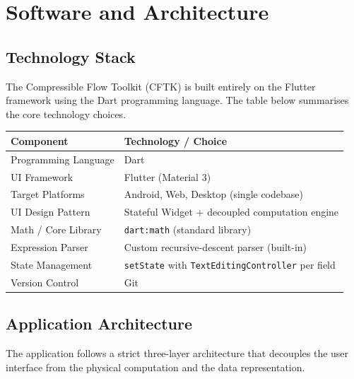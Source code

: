 \chapter{Software and Architecture}

\section{Technology Stack}

The Compressible Flow Toolkit (CFTK) is built entirely on the Flutter framework using the Dart programming language. The table below summarises the core technology choices.

\begin{center}
\begin{tabular}{@{}ll@{}}
\toprule
\textbf{Component} & \textbf{Technology / Choice} \\
\midrule
Programming Language & Dart \\
UI Framework & Flutter (Material 3) \\
Target Platforms & Android, Web, Desktop (single codebase) \\
UI Design Pattern & Stateful Widget + decoupled computation engine \\
Math / Core Library & \texttt{dart:math} (standard library) \\
Expression Parser & Custom recursive-descent parser (built-in) \\
State Management & \texttt{setState} with \texttt{TextEditingController} per field \\
Version Control & Git \\
\bottomrule
\end{tabular}
\end{center}

\section{Application Architecture}

The application follows a strict three-layer architecture that decouples the user interface from the physical computation and the data representation.

